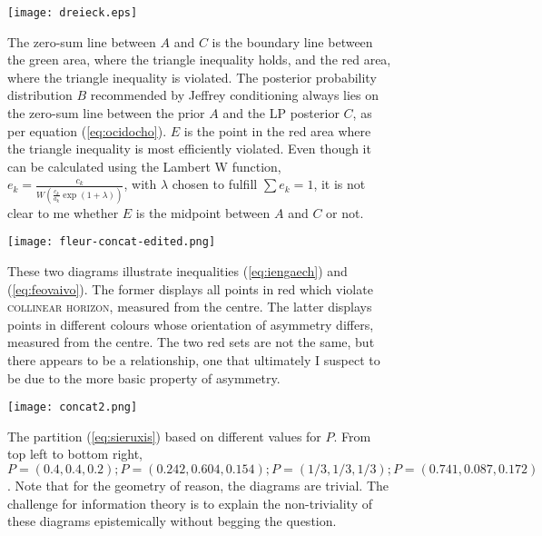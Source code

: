 \documentclass[smallextended]{svjour3}       %
\begin{document}
\begin{figure}[ht]
    \begin{minipage}[h]{.7\linewidth}
      \texttt{[image: dreieck.eps]}
      \caption{The zero-sum line between $A$ and $C$ is the boundary
        line between the green area, where the triangle inequality
        holds, and the red area, where the triangle inequality is
        violated. The posterior probability distribution $B$
        recommended by Jeffrey conditioning always lies on the
        zero-sum line between the prior $A$ and the LP posterior $C$,
        as per equation (\ref{eq:ocidocho}). $E$ is the point in the
        red area where the triangle inequality is most efficiently
        violated. Even though it can be calculated using the Lambert W
        function,
        $e_{k}=\frac{c_{k}}{W\left(\frac{c_{k}}{a_{k}}\exp(1+\lambda)\right)}$,
        with $\lambda$ chosen to fulfill $\sum{}e_{k}=1$, it is not
        clear to me whether $E$ is the midpoint between $A$ and $C$ or
        not.}
      \label{fig:eugoohue}
\end{minipage}
\end{figure}

\begin{figure}[ht]
  \begin{flushright}
    \begin{minipage}[h]{\linewidth}
     \texttt{[image: fleur-concat-edited.png]}
      \caption{\footnotesize These two diagrams illustrate
        inequalities (\ref{eq:iengaech}) and (\ref{eq:feovaivo}). The
        former displays all points in red which violate
        \textsc{collinear horizon}, measured from the centre. The
        latter displays points in different colours whose orientation
        of asymmetry differs, measured from the centre. The two red
        sets are not the same, but there appears to be a relationship,
        one that ultimately I suspect to be due to the more basic
        property of asymmetry.}
      \label{fig:eeghoomo}
    \end{minipage}
  \end{flushright}
\end{figure}

\begin{figure}[ht]
  \begin{flushright}
    \begin{minipage}[h]{\linewidth}
      \texttt{[image: concat2.png]}
      \caption{\footnotesize The partition (\ref{eq:sieruxis}) based
        on different values for $P$. From top left to bottom right,
        $P=(0.4,0.4,0.2); P=(0.242,0.604,0.154); P=(1/3,1/3,1/3);
        P=(0.741,0.087,0.172)$.
        Note that for the geometry of reason, the diagrams are
        trivial. The challenge for information theory is to explain
        the non-triviality of these diagrams epistemically without
        begging the question.}
      \label{fig:concat}
    \end{minipage}
  \end{flushright}
\end{figure}
\end{document}

